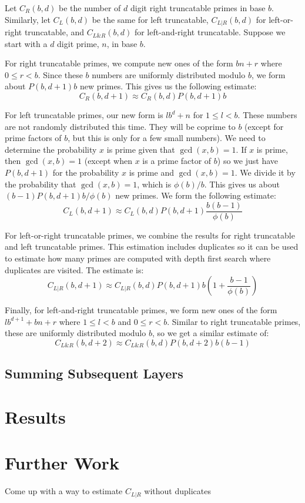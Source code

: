 \documentclass[12pt]{article}
\begin{document}
Let $C_R(b,d)$ be the number of $d$ digit right truncatable primes in base $b$. Similarly, let $C_L(b,d)$ be the same for left truncatable, $C_{L|R}(b,d)$ for left-or-right truncatable, and $C_{L\&R}(b,d)$ for left-and-right truncatable. Suppose we start with a $d$ digit prime, $n$, in base $b$.

For right truncatable primes, we compute new ones of the form $bn+r$ where $0\leq r<b$. Since these $b$ numbers are uniformly distributed modulo $b$, we form about $P(b,d+1)b$ new primes. This gives us the following estimate:
\begin{equation}
C_R(b,d+1) \approx C_R(b,d)P(b,d+1)b
\end{equation}

For left truncatable primes, our new form is $lb^d+n$ for $1\leq l<b$. These numbers are not randomly distributed this time. They will be coprime to $b$ (except for prime factors of $b$, but this is only for a few small numbers). We need to determine the probability $x$ is prime given that $\gcd(x,b)=1$. If $x$ is prime, then $\gcd(x,b)=1$ (except when $x$ is a prime factor of $b$) so we just have $P(b,d+1)$ for the probability $x$ is prime and $\gcd(x,b)=1$. We divide it by the probability that $\gcd(x,b)=1$, which is $\phi(b)/b$. This gives us about $(b-1)P(b,d+1)b/\phi(b)$ new primes. We form the following estimate:
\begin{equation}
C_L(b,d+1) \approx C_L(b,d)P(b,d+1)\frac{b(b-1)}{\phi(b)}
\end{equation}

For left-or-right truncatable primes, we combine the results for right truncatable and left truncatable primes. This estimation includes duplicates so it can be used to estimate how many primes are computed with depth first search where duplicates are visited. The estimate is:
\begin{equation}
C_{L|R}(b,d+1) \approx C_{L|R}(b,d)P(b,d+1)b\left(1+\frac{b-1}{\phi(b)}\right)
\end{equation}

Finally, for left-and-right truncatable primes, we form new ones of the form $lb^{d+1}+bn+r$ where $1\leq l<b$ and $0\leq r<b$. Similar to right truncatable primes, these are uniformly distributed modulo $b$, so we get a similar estimate of:
\begin{equation}
C_{L\&R}(b,d+2) \approx C_{L\&R}(b,d)P(b,d+2)b(b-1)
\end{equation}

\subsection{Summing Subsequent Layers}

\section{Results}

\section{Further Work}

Come up with a way to estimate $C_{L|R}$ without duplicates

\printbibliography[title={References}]
\end{document}
